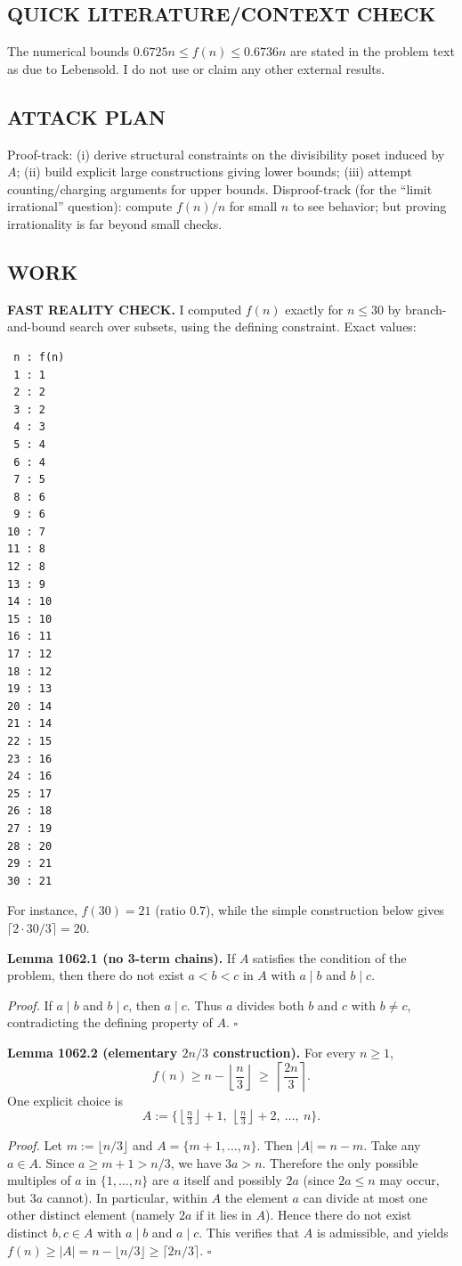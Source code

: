 \subsection*{QUICK LITERATURE/CONTEXT CHECK}
The numerical bounds $0.6725n\le f(n)\le 0.6736n$ are stated in the problem text as due to Lebensold. I do not use or claim any other external results.

\subsection*{ATTACK PLAN}
Proof-track: (i) derive structural constraints on the divisibility poset induced by $A$; (ii) build explicit large constructions giving lower bounds; (iii) attempt counting/charging arguments for upper bounds.
Disproof-track (for the ``limit irrational'' question): compute $f(n)/n$ for small $n$ to see behavior; but proving irrationality is far beyond small checks.

\subsection*{WORK}
\textbf{FAST REALITY CHECK.}
I computed $f(n)$ exactly for $n\le 30$ by branch-and-bound search over subsets, using the defining constraint.
Exact values:
\begin{verbatim}
 n : f(n)
 1 : 1
 2 : 2
 3 : 2
 4 : 3
 5 : 4
 6 : 4
 7 : 5
 8 : 6
 9 : 6
10 : 7
11 : 8
12 : 8
13 : 9
14 : 10
15 : 10
16 : 11
17 : 12
18 : 12
19 : 13
20 : 14
21 : 14
22 : 15
23 : 16
24 : 16
25 : 17
26 : 18
27 : 19
28 : 20
29 : 21
30 : 21
\end{verbatim}
For instance, $f(30)=21$ (ratio $0.7$), while the simple construction below gives $\lceil 2\cdot 30/3\rceil=20$.

\medskip
\textbf{Lemma 1062.1 (no 3-term chains).}
If $A$ satisfies the condition of the problem, then there do not exist $a<b<c$ in $A$ with $a\mid b$ and $b\mid c$.

\emph{Proof.}
If $a\mid b$ and $b\mid c$, then $a\mid c$. Thus $a$ divides both $b$ and $c$ with $b\ne c$, contradicting the defining property of $A$. \hfill$\square$

\medskip
\textbf{Lemma 1062.2 (elementary $2n/3$ construction).}
For every $n\ge 1$,
\[
f(n)\ge n-\left\lfloor\frac n3\right\rfloor\ \ge\ \left\lceil\frac{2n}{3}\right\rceil.
\]
One explicit choice is
\[
A:=\Big\{\left\lfloor\tfrac n3\right\rfloor+1,\ \left\lfloor\tfrac n3\right\rfloor+2,\ \dots,\ n\Big\}.
\]

\emph{Proof.}
Let $m:=\lfloor n/3\rfloor$ and $A=\{m+1,\dots,n\}$. Then $|A|=n-m$.
Take any $a\in A$. Since $a\ge m+1>n/3$, we have $3a>n$.
Therefore the only possible multiples of $a$ in $\{1,\dots,n\}$ are $a$ itself and possibly $2a$ (since $2a\le n$ may occur, but $3a$ cannot).
In particular, within $A$ the element $a$ can divide at most one other distinct element (namely $2a$ if it lies in $A$).
Hence there do not exist distinct $b,c\in A$ with $a\mid b$ and $a\mid c$. This verifies that $A$ is admissible, and yields $f(n)\ge |A|=n-\lfloor n/3\rfloor\ge \lceil 2n/3\rceil$. \hfill$\square$

